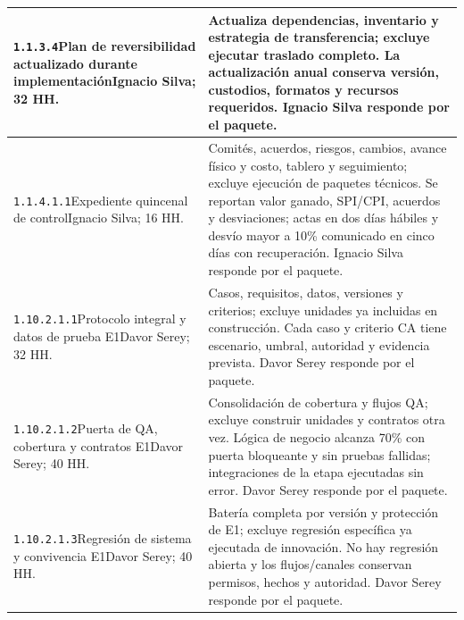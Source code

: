 \begin{longtable}{L{52mm}L{91mm}}
\texttt{1.\allowbreak{}1.\allowbreak{}3.\allowbreak{}4}\newline Plan de reversibilidad actualizado durante implementación\newline Ignacio Silva; 32 HH. & Actualiza dependencias, inventario y estrategia de transferencia; excluye ejecutar traslado completo. La actualización anual conserva versión, custodios, formatos y recursos requeridos. Ignacio Silva responde por el paquete.\\\hline
\texttt{1.\allowbreak{}1.\allowbreak{}4.\allowbreak{}1.\allowbreak{}1}\newline Expediente quincenal de control\newline Ignacio Silva; 16 HH. & Comités, acuerdos, riesgos, cambios, avance físico y costo, tablero y seguimiento; excluye ejecución de paquetes técnicos. Se reportan valor ganado, SPI/CPI, acuerdos y desviaciones; actas en dos días hábiles y desvío mayor a 10\% comunicado en cinco días con recuperación. Ignacio Silva responde por el paquete.\\\hline
\texttt{1.\allowbreak{}10.\allowbreak{}2.\allowbreak{}1.\allowbreak{}1}\newline Protocolo integral y datos de prueba E1\newline Davor Serey; 32 HH. & Casos, requisitos, datos, versiones y criterios; excluye unidades ya incluidas en construcción. Cada caso y criterio CA tiene escenario, umbral, autoridad y evidencia prevista. Davor Serey responde por el paquete.\\\hline
\texttt{1.\allowbreak{}10.\allowbreak{}2.\allowbreak{}1.\allowbreak{}2}\newline Puerta de QA, cobertura y contratos E1\newline Davor Serey; 40 HH. & Consolidación de cobertura y flujos QA; excluye construir unidades y contratos otra vez. Lógica de negocio alcanza 70\% con puerta bloqueante y sin pruebas fallidas; integraciones de la etapa ejecutadas sin error. Davor Serey responde por el paquete.\\\hline
\texttt{1.\allowbreak{}10.\allowbreak{}2.\allowbreak{}1.\allowbreak{}3}\newline Regresión de sistema y convivencia E1\newline Davor Serey; 40 HH. & Batería completa por versión y protección de E1; excluye regresión específica ya ejecutada de innovación. No hay regresión abierta y los flujos/canales conservan permisos, hechos y autoridad. Davor Serey responde por el paquete.\\\hline

\end{longtable}
